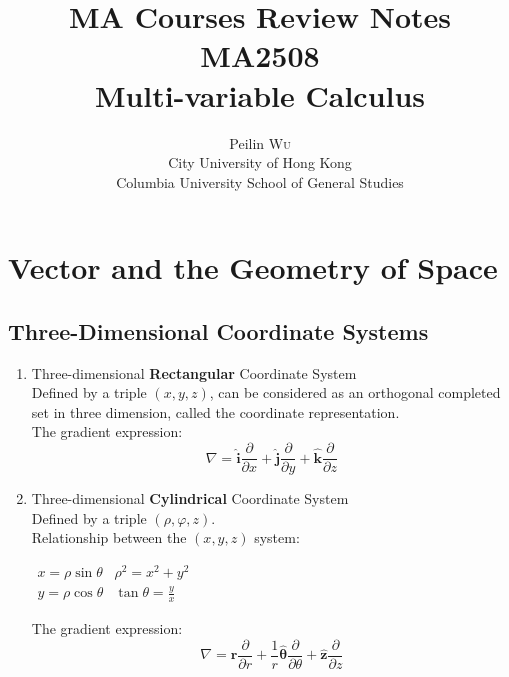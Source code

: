 \documentclass[UTF8,a4paper, 10pt, openany]{book}
\title{MA Courses Review Notes\\MA2508\\Multi-variable Calculus}
\author{Peilin \textsc{Wu}\\ City University of Hong Kong\\Columbia University School of General Studies}
\begin{document}
\frontmatter
\maketitle
\tableofcontents

\mainmatter
\chapter{Vector and the Geometry of Space}
\section{Three-Dimensional Coordinate Systems}
\begin{enumerate}
\item Three-dimensional \textbf{Rectangular} Coordinate System
\\Defined by a triple $(x, y, z)$, can be considered as an orthogonal completed set in three dimension, called the coordinate representation. \\
The gradient expression:
\begin{equation}
 \boxed{\nabla = \mathbf{\hat{i}}\dfrac{\partial }{\partial x}+\mathbf{\hat{j}}\dfrac{\partial }{\partial y}+\mathbf{\hat{k}}\dfrac{\partial }{\partial z}}
\end{equation}

\item Three-dimensional \textbf{Cylindrical} Coordinate System
\\Defined by a triple $(\rho, \varphi, z)$.\\
Relationship between the $(x, y, z)$ system:
\begin{center}
$\begin{array}{cc}
x = \rho \sin \theta  &  \rho ^2 = x^2+y^2\\
y = \rho \cos \theta  &  \tan \theta = \frac{y}{x}
\end{array}$
\end{center}
The gradient expression:
\begin{equation}
 \boxed{\nabla = \mathbf{\hat{r}}\dfrac{\partial }{\partial r}+\dfrac{1}{r}\mathbf{\hat{\theta}}\dfrac{\partial }{\partial \theta}+\mathbf{\hat{z}}\dfrac{\partial }{\partial z}}
\end{equation}


\end{enumerate}
\end{document}
